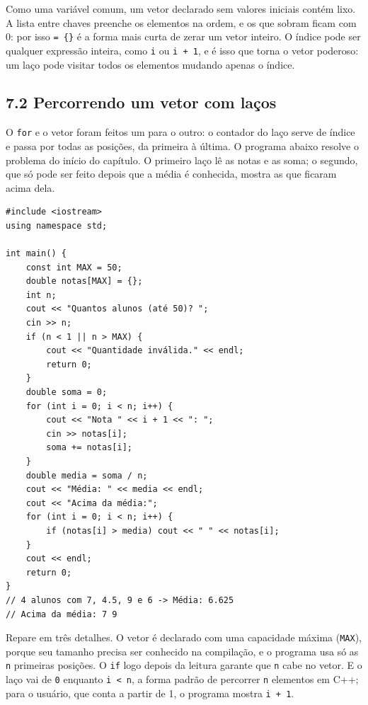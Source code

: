 Como uma variável comum, um vetor declarado sem valores iniciais contém lixo. A lista entre chaves preenche os elementos na ordem, e os que sobram ficam com 0: por isso \texttt{= \{\}} é a forma mais curta de zerar um vetor inteiro. O índice pode ser qualquer expressão inteira, como \texttt{i} ou \texttt{i + 1}, e é isso que torna o vetor poderoso: um laço pode visitar todos os elementos mudando apenas o índice.

\subsection{7.2 Percorrendo um vetor com laços}

O \texttt{for} e o vetor foram feitos um para o outro: o contador do laço serve de índice e passa por todas as posições, da primeira à última. O programa abaixo resolve o problema do início do capítulo. O primeiro laço lê as notas e as soma; o segundo, que só pode ser feito depois que a média é conhecida, mostra as que ficaram acima dela.

\begin{codigo}
\begin{Verbatim}[breaklines=true, breaksymbolleft={}, fontsize=\footnotesize]
#include <iostream>
using namespace std;

int main() {
    const int MAX = 50;
    double notas[MAX] = {};
    int n;
    cout << "Quantos alunos (até 50)? ";
    cin >> n;
    if (n < 1 || n > MAX) {
        cout << "Quantidade inválida." << endl;
        return 0;
    }
    double soma = 0;
    for (int i = 0; i < n; i++) {
        cout << "Nota " << i + 1 << ": ";
        cin >> notas[i];
        soma += notas[i];
    }
    double media = soma / n;
    cout << "Média: " << media << endl;
    cout << "Acima da média:";
    for (int i = 0; i < n; i++) {
        if (notas[i] > media) cout << " " << notas[i];
    }
    cout << endl;
    return 0;
}
// 4 alunos com 7, 4.5, 9 e 6 -> Média: 6.625
// Acima da média: 7 9
\end{Verbatim}
\end{codigo}

Repare em três detalhes. O vetor é declarado com uma capacidade máxima (\texttt{MAX}), porque seu tamanho precisa ser conhecido na compilação, e o programa usa só as \texttt{n} primeiras posições. O \texttt{if} logo depois da leitura garante que \texttt{n} cabe no vetor. E o laço vai de \texttt{0} enquanto \texttt{i < n}, a forma padrão de percorrer \texttt{n} elementos em C++; para o usuário, que conta a partir de 1, o programa mostra \texttt{i + 1}.

